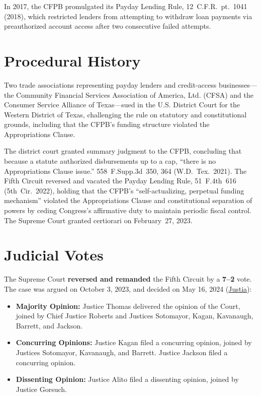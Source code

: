 \documentclass[12pt]{article}
\begin{document}
In 2017, the CFPB promulgated its Payday Lending Rule, 12~C.F.R.~pt.~1041 (2018), which restricted lenders from attempting to withdraw loan payments via preauthorized account access after two consecutive failed attempts.

\section{Procedural History}
Two trade associations representing payday lenders and credit-access businesses---the Community Financial Services Association of America, Ltd. (CFSA) and the Consumer Service Alliance of Texas---sued in the U.S. District Court for the Western District of Texas, challenging the rule on statutory and constitutional grounds, including that the CFPB's funding structure violated the Appropriations Clause.

The district court granted summary judgment to the CFPB, concluding that because a statute authorized disbursements up to a cap, ``there is no Appropriations Clause issue.'' 558~F.Supp.3d~350, 364 (W.D.~Tex.~2021). The Fifth Circuit reversed and vacated the Payday Lending Rule, 51~F.4th~616 (5th~Cir.~2022), holding that the CFPB's ``self-actualizing, perpetual funding mechanism'' violated the Appropriations Clause and constitutional separation of powers by ceding Congress's affirmative duty to maintain periodic fiscal control. The Supreme Court granted certiorari on February~27, 2023.

\section{Judicial Votes}
The Supreme Court \textbf{reversed and remanded} the Fifth Circuit by a \textbf{7--2} vote. The case was argued on October 3, 2023, and decided on May 16, 2024 (\href{https://supreme.justia.com/cases/federal/us/601/22-448/}{Justia}):

\begin{itemize}
    \item \textbf{Majority Opinion:} Justice Thomas delivered the opinion of the Court, joined by Chief Justice Roberts and Justices Sotomayor, Kagan, Kavanaugh, Barrett, and Jackson.
    \item \textbf{Concurring Opinions:} Justice Kagan filed a concurring opinion, joined by Justices Sotomayor, Kavanaugh, and Barrett. Justice Jackson filed a concurring opinion.
    \item \textbf{Dissenting Opinion:} Justice Alito filed a dissenting opinion, joined by Justice Gorsuch.
\end{itemize}
\end{document}
